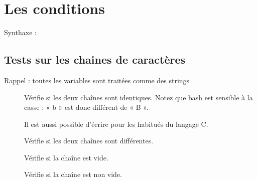 \documentclass[letterpaper,10pt,french]{sphinxmanual}
\begin{document}
\section{Les conditions}
\label{\detokenize{21-scripts-shell:les-conditions}}
Synthaxe :

%
\begin{sphinxVerbatim}[commandchars=\\\{\}]
 \PYG{o}{[}    \PYG{o}{]}     
         
 \PYG{o}{[}    \PYG{o}{]}
         
 \PYG{o}{[}    \PYG{o}{]}
         
         
\end{sphinxVerbatim}


\subsection{Tests sur les chaines de caractères}
\label{\detokenize{21-scripts-shell:tests-sur-les-chaines-de-caracteres}}
Rappel : toutes les variables sont traitées comme des strings
\begin{description}
\item[{}] \leavevmode
Vérifie si les deux chaînes sont identiques. Notez que bash est sensible à la casse : « b » est donc différent de « B ».

Il est aussi possible d’écrire \sphinxcode{\sphinxupquote{==}} pour les habitués du langage C.

\item[{}] \leavevmode
Vérifie si les deux chaînes sont différentes.

\item[{}] \leavevmode
Vérifie si la chaîne est vide.

\item[{}] \leavevmode
Vérifie si la chaîne est non vide.

\end{description}
\end{document}
